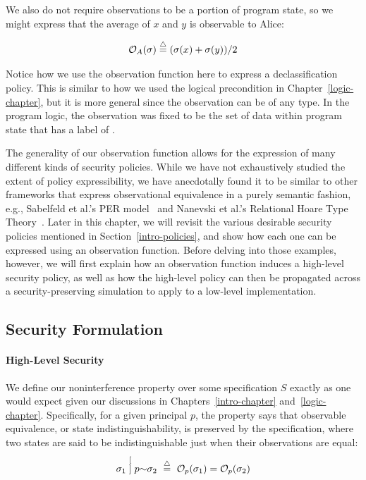 \noindent{}We also do not require observations to be a portion of program state, so we
might express that the average of $x$ and $y$ is observable to Alice:

{\small\[\mathcal{O}_{A}(\sigma) \stackrel{\triangle}{=} (\sigma(x) + \sigma(y)) / 2 \]}%

\noindent{}Notice how we use the observation function here to express
a declassification policy. This is similar to how we used the logical
precondition in Chapter~\ref{logic-chapter}, but it is more general since the
observation can be of any type. In the program logic, the observation
was fixed to be the set of data within program state that has a 
label of \lo{}.

The generality of our observation function allows for the expression of many
different kinds of security policies. While we have not exhaustively
studied the extent of policy expressibility, we have anecdotally found
it to be similar to other frameworks that express observational equivalence
in a purely semantic fashion, e.g., Sabelfeld et al.'s PER model~\cite{sabelfeld99} 
and Nanevski et al.'s Relational Hoare Type Theory~\cite{rhtt}. Later in
this chapter, we will revisit the various desirable security policies
mentioned in Section~\ref{intro-policies}, and show how each one can
be expressed using an observation function. Before delving into those
examples, however, we will first explain how an observation function 
induces a high-level security policy, as well as how the high-level policy 
can then be propagated across a security-preserving simulation to apply to a
low-level implementation.

\subsection{Security Formulation}
\label{informal-security}

\paragraph{High-Level Security}
We define our noninterference property over some specification $S$
exactly as one would expect given our
discussions in Chapters~\ref{intro-chapter} and~\ref{logic-chapter}.
Specifically, for a given principal $p$, the property says that 
observable equivalence, or state indistinguishability, is preserved by the
specification, where two states are said to be indistinguishable 
just when their observations are equal:
\[\sigma_1 \stackrel[]{p}{\sim} \sigma_2 \,\, \stackrel{\triangle}{=} \,\, 
\mathcal{O}_{p}(\sigma_1) = \mathcal{O}_{p}(\sigma_2)\]

